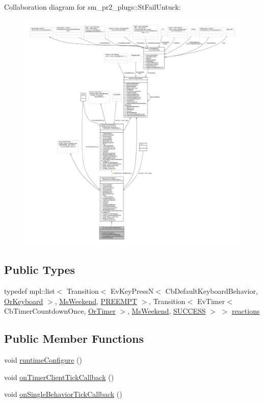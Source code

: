 Collaboration diagram for sm\+\_\+pr2\+\_\+plugs\+:\+:St\+Fail\+Untuck\+:
\nopagebreak
\begin{figure}[H]
\begin{center}
\leavevmode
\includegraphics[width=350pt]{structsm__pr2__plugs_1_1StFailUntuck__coll__graph}
\end{center}
\end{figure}
\subsection*{Public Types}
\begin{DoxyCompactItemize}
\item 
typedef mpl\+::list$<$ Transition$<$ Ev\+Key\+PressN$<$ Cb\+Default\+Keyboard\+Behavior, \hyperlink{classsm__pr2__plugs_1_1OrKeyboard}{Or\+Keyboard} $>$, \hyperlink{classsm__pr2__plugs_1_1MsWeekend}{Ms\+Weekend}, \hyperlink{classPREEMPT}{P\+R\+E\+E\+M\+PT} $>$, Transition$<$ Ev\+Timer$<$ Cb\+Timer\+Countdown\+Once, \hyperlink{classsm__pr2__plugs_1_1OrTimer}{Or\+Timer} $>$, \hyperlink{classsm__pr2__plugs_1_1MsWeekend}{Ms\+Weekend}, \hyperlink{classSUCCESS}{S\+U\+C\+C\+E\+SS} $>$ $>$ \hyperlink{structsm__pr2__plugs_1_1StFailUntuck_a2761af1a5a323afe29a5a9a79e52f951}{reactions}
\end{DoxyCompactItemize}
\subsection*{Public Member Functions}
\begin{DoxyCompactItemize}
\item 
void \hyperlink{structsm__pr2__plugs_1_1StFailUntuck_af2e650b9c6962deb4740dd3e085a9978}{runtime\+Configure} ()
\item 
void \hyperlink{structsm__pr2__plugs_1_1StFailUntuck_a8b5c97b9980e1e8013f78a1e452621e9}{on\+Timer\+Client\+Tick\+Callback} ()
\item 
void \hyperlink{structsm__pr2__plugs_1_1StFailUntuck_a5aca3bee084f0d3df264ed2d973f291a}{on\+Single\+Behavior\+Tick\+Callback} ()
\end{DoxyCompactItemize}
